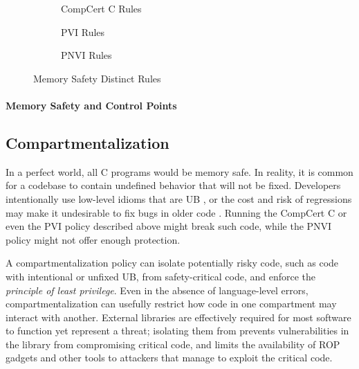 \documentclass{llncs}
\begin{document}
\begin{figure}
  \begin{subfigure}{\textwidth}

    \caption{CompCert C Rules}
    \label{subfig:memcompcert}
  \end{subfigure}
  \begin{subfigure}{\textwidth}
    \vspace{-2.5em}
    
    \caption{PVI Rules}
    \label{subfig:memcompcert}
  \end{subfigure}
  \begin{subfigure}{\textwidth}

    \caption{PNVI Rules}
    \label{subfig:memcompcert}
  \end{subfigure}
  
  \caption{Memory Safety Distinct Rules}
  \label{fig:memdistinct}
\end{figure}

\paragraph*{Memory Safety and Control Points}

\subsection{Compartmentalization}

In a perfect world, all C programs would be memory safe. In reality, it is common
for a codebase to contain undefined behavior that will not be fixed. Developers intentionally use 
low-level idioms that are UB \cite{Memarian16:DeFacto}, or the cost and risk of regressions may make it
undesirable to fix bugs in older code \cite{Bessey10:Coverity}. Running the CompCert C or even
the PVI policy described above might break such code, while the PNVI policy might not offer enough
protection.

A compartmentalization policy can isolate potentially risky code, such as code with intentional
or unfixed UB, from safety-critical code, and enforce the {\em principle of least privilege}. 
Even in the absence of language-level errors, compartmentalization can usefully 
restrict how code in one compartment may interact with another. External libraries are
effectively required for most software to function yet represent a threat; isolating 
them from prevents vulnerabilities in the library from compromising critical code,
and limits the availability of ROP gadgets and other tools to attackers that manage to
exploit the critical code.
\end{document}

